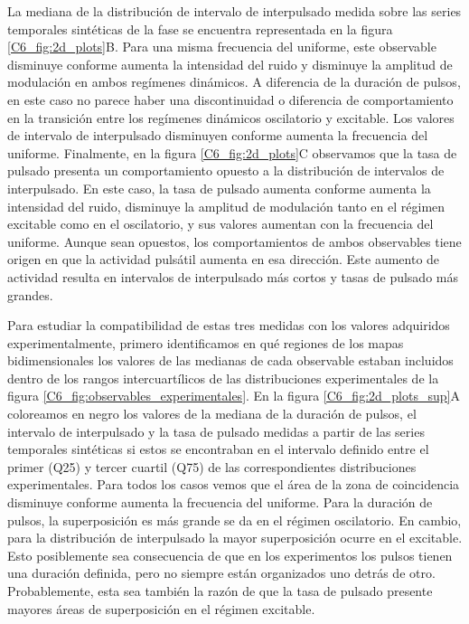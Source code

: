 \documentclass[./main.tex]{subfiles}
\begin{document}
La mediana de la distribución de intervalo de interpulsado medida sobre las series temporales sintéticas de la fase se encuentra representada en la figura \ref{C6_fig:2d_plots}B. Para una misma frecuencia del uniforme, este observable disminuye conforme aumenta la intensidad del ruido y disminuye la amplitud de modulación en ambos regímenes dinámicos. A diferencia de la duración de pulsos, en este caso no parece haber una discontinuidad o diferencia de comportamiento en la transición entre los regímenes dinámicos oscilatorio y excitable. Los valores de intervalo de interpulsado disminuyen conforme aumenta la frecuencia del uniforme. Finalmente, en la figura \ref{C6_fig:2d_plots}C observamos que la tasa de pulsado presenta un comportamiento opuesto a la distribución de intervalos de interpulsado. En este caso, la tasa de pulsado aumenta conforme aumenta la intensidad del ruido, disminuye la amplitud de modulación tanto en el régimen excitable como en el oscilatorio, y sus valores aumentan con la frecuencia del uniforme. Aunque sean opuestos, los comportamientos de ambos observables tiene origen en que la actividad pulsátil aumenta en esa dirección. Este aumento de actividad resulta en intervalos de interpulsado más cortos y tasas de pulsado más grandes. 


Para estudiar la compatibilidad de estas tres medidas con los valores adquiridos experimentalmente, primero identificamos en qué regiones de los mapas bidimensionales los valores de las medianas de cada observable estaban incluidos dentro de los rangos intercuartílicos de las distribuciones experimentales de la figura \ref{C6_fig:observables_experimentales}. En la figura \ref{C6_fig:2d_plots_sup}A coloreamos en negro los valores de la mediana de la duración de pulsos, el intervalo de interpulsado y la tasa de pulsado medidas a partir de las series temporales sintéticas si estos se encontraban en el intervalo definido entre el primer (Q25) y tercer cuartil (Q75) de las correspondientes distribuciones experimentales. Para todos los casos vemos que el área de la zona de coincidencia disminuye conforme aumenta la frecuencia del uniforme. Para la duración de pulsos, la superposición es más grande se da en el régimen oscilatorio. En cambio, para la distribución de interpulsado la mayor superposición ocurre en el excitable. Esto posiblemente sea consecuencia de que en los experimentos los pulsos tienen una duración definida, pero no siempre están organizados uno detrás de otro. Probablemente, esta sea también la razón de que la tasa de pulsado presente mayores áreas de superposición en el régimen excitable. 
\end{document}
